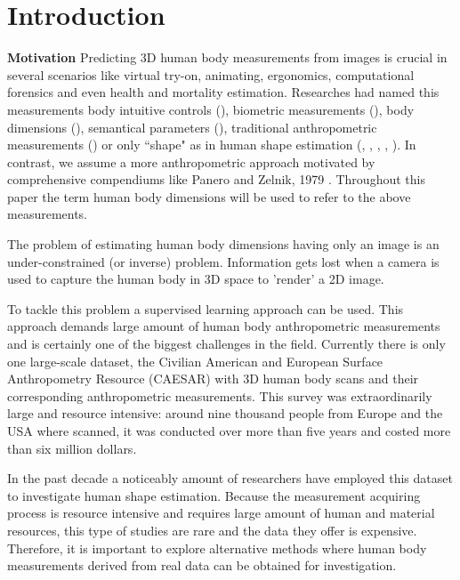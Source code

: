 \documentclass[10pt,twocolumn,letterpaper]{article}
\begin{document}
\section{Introduction}

\textbf{Motivation} 
Predicting 3D human body measurements from images is crucial in several 
scenarios 
like virtual try-on, animating, ergonomics, computational forensics and 
even health and mortality estimation. Researches had 
named this 
measurements body intuitive controls (\cite{Allen.2003}), biometric 
measurements (\cite{Sigal.2008}), body dimensions 
(\cite{DBLP:conf/bmvc/ChenRC11}), semantical parameters (\cite{Yang.2014}), 
traditional anthropometric 
measurements 
(\cite{Wuhrer2011}) or only ``shape" as in human shape estimation 
(\cite{Guan.2013}, \cite{Bogo:ECCV:2016}, \cite{Loper.2015}, 
\cite{Dibra.2016a}, \cite{Pishchulin.2017}). In contrast, we assume a more 
anthropometric approach 
motivated by comprehensive compendiums like Panero and Zelnik, 1979 
\cite{panero1979human}.
Throughout this paper the term human body 
dimensions 
will be used to refer to the above measurements.

The problem of estimating human body dimensions  
having only an image is an under-constrained  (or inverse) problem. Information 
gets lost when a camera is 
used to capture the human body in 3D space to 'render' a 2D image.

To tackle this problem a supervised learning approach can be used. This approach
demands large amount of human body anthropometric measurements and is certainly 
one of the biggest challenges in the field.  Currently there 
is only one large-scale dataset, the Civilian American and 
European Surface Anthropometry Resource (CAESAR) \cite{robinette1999caesar} 
with 3D human body scans and their corresponding anthropometric measurements. 
This survey was extraordinarily large and resource intensive: around nine 
thousand people from Europe and the USA where scanned, it was conducted over 
more than five years and costed more than six million dollars.

In the past decade a noticeably amount of researchers have employed this 
dataset to investigate human shape estimation. Because the measurement 
acquiring process is resource intensive and requires large amount of human and 
material resources, this type of studies are rare and the data they offer is 
expensive. Therefore, it is important to explore alternative methods where 
human body measurements derived from real data can be obtained for 
investigation.
\end{document}

